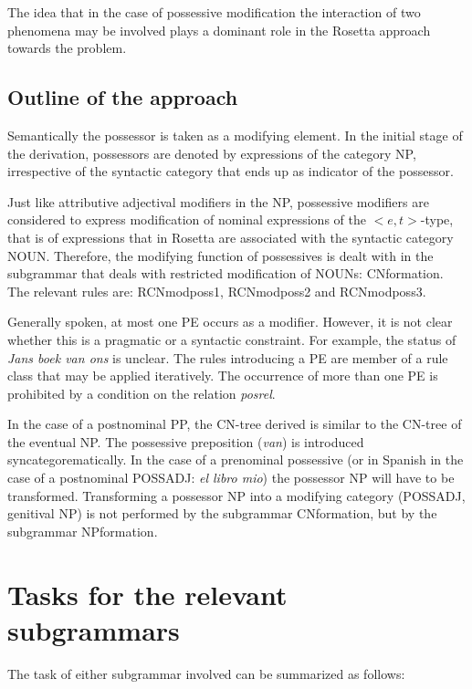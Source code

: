 \noindent
The idea that in the case of possessive modification the interaction
of two phenomena  may be involved plays a dominant role
in the Rosetta approach towards the problem.

\subsection{Outline of the approach}
Semantically the 
possessor is taken as a
modifying element. In the initial stage of the derivation,  
possessors are denoted by expressions of the 
category NP, irrespective of the syntactic category 
that ends up as indicator of the possessor. 

Just like attributive adjectival modifiers in the NP, possessive modifiers 
are considered to express modification of nominal expressions of the 
$<e,t>$-type, that is of 
expressions that in Rosetta are associated with the syntactic category NOUN.
Therefore, the modifying function of possessives is dealt with in the subgrammar 
that deals with restricted modification of NOUNs: CNformation.
The relevant rules are: RCNmodposs1, RCNmodposs2 and RCNmodposs3.

Generally spoken, at most one PE occurs as a modifier. However, it is not clear 
whether this is a pragmatic or a syntactic constraint. For example, the status
of {\em Jans boek van ons} is unclear. The rules introducing 
a PE are member of a rule class that may be applied iteratively. 
The occurrence of more than one PE is prohibited by a condition on the 
relation {\em posrel}.


In the case of a postnominal PP, the CN-tree derived is similar 
to the CN-tree of the eventual NP. The possessive preposition ({\em van}) is
introduced syncategorematically. 
In the case of a prenominal possessive (or in Spanish in the case of a 
postnominal POSSADJ: {\em el libro mio}) the possessor NP will have to be 
transformed. Transforming a possessor NP into a modifying category 
(POSSADJ, genitival NP) 
is not performed by the subgrammar CNformation, but by the 
subgrammar NPformation.

\section{Tasks for the relevant subgrammars}

The task of either subgrammar involved can be summarized as follows:

